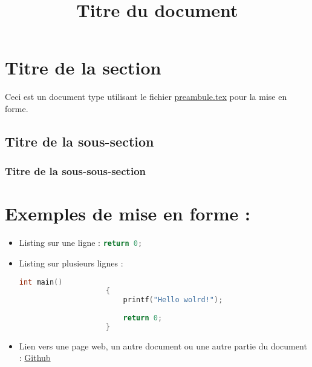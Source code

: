 
\title{\textbf{\Huge Titre du document}\vspace{-4ex}}


\maketitle

	\section{Titre de la section}	
	Ceci est un document type utilisant le fichier \href{preambule.tex}{preambule.tex} pour la mise en forme. 
		
		\subsection{Titre de la sous-section}
			\lipsum[1]
			
			\subsubsection{Titre de la sous-sous-section}
				\lipsum[2]
			
			
	\section{Exemples de mise en forme :}
		\begin{itemize}
			\item Listing sur une ligne : \lstinline[language=C]!return 0;!
			\item Listing sur plusieurs lignes :
				\begin{lstlisting}[language=C]
					int main()
					{
						printf("Hello wolrd!");
						
						return 0;
					}
				\end{lstlisting}
			\item Lien vers une page web, un autre document ou une autre partie du document : \href{https://github.com/Mzem/ProjetS6}{Github}
		\end{itemize}
		

